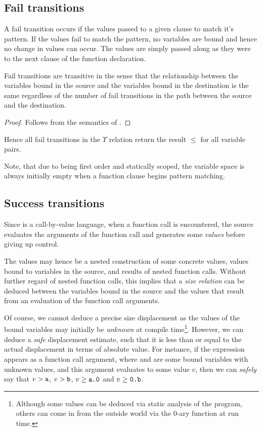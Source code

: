 \subsection{Fail transitions}

A fail transition occurs if the values passed to a given clause to match it's
pattern. If the values fail to match the pattern, no variables are bound and
hence no change in values can occur. The values are simply passed along as they
were to the next clause of the function declaration.

\begin{lemma} Fail transitions are transitive in the sense that the
relationship between the variables bound in the source and the variables bound
in the destination is the same regardless of the number of fail transitions in
the path between the source and the destination.\end{lemma}

\begin{proof} Follows from the semantics of \D{}. \end{proof}

Hence all fail transitions in the $\Upsilon$ relation return the result $\leq$
for all variable pairs.

Note, that due to \D{} being first order and statically scoped, the variable
space is always initially empty when a function clause begins pattern matching.

\subsection{Success transitions}

Since \D{} is a call-by-value language, when a function call is encountered,
the source evaluates the arguments of the function call and generates some
\emph{values} before giving up control.

The values may hence be a nested construction of some concrete values, values
bound to variables in the source, and results of nested function calls. Without
further regard of nested function calls, this implies that a \emph{size
relation} can be deduced between the variables bound in the source and the
values that result from an evaluation of the function call arguments. 

Of course, we cannot deduce a precise size displacement as the values of the
bound variables may initially be \emph{unknown} at compile
time\footnote{Although some values can be deduced via static analysis of the
program, others can come in from the outside world via the 0-ary function
 at run time.}.  However, we can deduce a \emph{safe} displacement
estimate, such that it is less than or equal to the actual displacement in
terms of absolute value. For instance, if the expression  appears as
a function call argument, where  and  are some bound variables
with unknown values, and this argument evaluates to some value $v$, then we can
\emph{safely} say that $v>\text{{\ttfamily a}}$, $v>\text{{\ttfamily b}}$,
$v\geq\text{{\ttfamily a.0}}$ and $v\geq\text{{\ttfamily0.b}}$.

